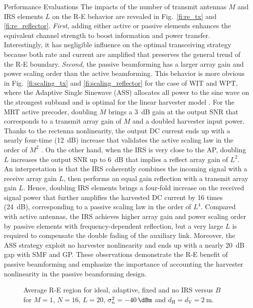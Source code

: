 \documentclass[journal]{IEEEtran}
\begin{document}
\begin{section}{Performance Evaluations}
		The impacts of the number of transmit antennas $M$ and IRS elements $L$ on the R-E behavior are revealed in Fig.~\ref{fi:re_tx} and \ref{fi:re_reflector}. \textit{First,} adding either active or passive elements enhances the equivalent channel strength to boost information and power transfer. Interestingly, it has negligible influence on the optimal transceiving strategy because both rate and current are amplified that preserves the general trend of the R-E boundary. \textit{Second,} the passive beamforming has a larger array gain and power scaling order than the active beamforming. This behavior is more obvious in Fig.~\ref{fi:scaling_tx} and \ref{fi:scaling_reflector} for the case of WIT and WPT, where the Adaptive Single Sinewave (ASS) allocates all power to the sine wave on the strongest subband and is optimal for the linear harvester model \cite{Clerckx2016a}. For the MRT active precoder, doubling $M$ brings a \SI{3}{\dB} gain at the output SNR that corresponds to a transmit array gain of $M$ and a doubled harvester input power. Thanks to the rectenna nonlinearity, the output DC current ends up with a nearly four-time (\SI{12}{\dB}) increase that validates the active scaling law in the order of $M^2$ \cite{Clerckx2016a}. On the other hand, when the IRS is very close to the AP, doubling $L$ increases the output SNR up to \SI{6}{\dB} that implies a reflect array gain of $L^2$. An interpretation is that the IRS coherently combines the incoming signal with a receive array gain $L$, then performs an equal gain reflection with a transmit array gain $L$. Hence, doubling IRS elements brings a four-fold increase on the received signal power that further amplifies the harvested DC current by \num{16} times (\SI{24}{\dB}), corresponding to a passive scaling law in the order of $L^4$. Compared with active antennas, the IRS achieves higher array gain and power scaling order by passive elements with frequency-dependent reflection, but a very large $L$ is required to compensate the double fading of the auxiliary link. Moreover, the ASS strategy exploit no harvester nonlinearity and ends up with a nearly \SI{20}{\dB} gap with SMF and GP. These observations demonstrate the R-E benefit of passive beamforming and emphasize the importance of accounting the harvester nonlinearity in the passive beamforming design.

		\begin{figure}[!t]
			\centering
			\subfloat[$B=\SI{1}{\MHz}$\label{fi:re_irs_1mhz}]{
				\resizebox{0.45\columnwidth}{!}{
					
				}
			}
			\subfloat[$B=\SI{10}{\MHz}$\label{fi:re_irs_10mhz}]{
				\resizebox{0.45\columnwidth}{!}{
					
				}
			}
			\caption{Average R-E region for ideal, adaptive, fixed and no IRS versus $B$ for $M=1$, $N=16$, $L=20$, $\sigma_n^2=\SI{-40}{\dBm}$ and $d_{\mathrm{H}}=d_{\mathrm{V}}=\SI{2}{\meter}$.}
		\end{figure}


\end{section}
\end{document}
